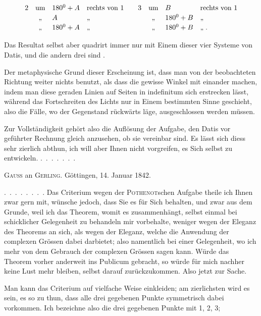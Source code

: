 \[
\begin{array}{rcll@{\qquad}rcll}
2 & \text{um} & 180^0+A & \text{rechts von }1 & 3 & \text{um} & B & \text{rechts von }1\\[2pt]
 & \text{,,} & A & \text{,,} & & \text{,,} & 180^0+B & \text{,,}\\[2pt]
 & \text{,,} & 180^0+A & \text{,,} & & \text{,,} & 180^0+B & \text{,,}\;.
\end{array}
\]

Das Resultat selbst aber quadrirt immer nur mit Einem dieser vier Systeme von Datis, und die andern drei sind .

Der metaphysische Grund dieser Erscheinung ist, dass man von der beobachteten Richtung weiter nichts benutzt, als dass die  gewisse Winkel mit einander machen, indem man diese geraden Linien auf  Seiten in indefinitum sich erstrecken lässt, während das Fortschreiten des Lichts nur in Einem bestimmten Sinne geschieht, also die Fälle, wo der Gegenstand rückwärts läge, ausgeschlossen werden müssen.

Zur Vollständigkeit gehört also die Auflösung der Aufgabe, den Datis vor geführter Rechnung gleich anzusehen, ob sie vereinbar sind. Es lässt sich diess sehr zierlich abthun, ich will aber Ihnen nicht vorgreifen, es Sich selbst zu entwickeln. \mbox{. . . . . . .}



\centerline{\textsc{Gauss} an \textsc{Gerling}. Göttingen, 14. Januar 1842.}

\indent \mbox{. . . . . . . .} Das Criterium wegen der \textsc{Pothenot}schen Aufgabe theile ich Ihnen zwar gern mit, wünsche jedoch, dass Sie es für Sich behalten, und zwar aus dem Grunde, weil ich das Theorem, womit es zusammenhängt, selbst einmal bei schicklicher Gelegenheit zu behandeln mir vorbehalte, weniger wegen der Eleganz des Theorems an sich, als wegen der Eleganz, welche die Anwendung der complexen Grössen dabei darbietet; also namentlich bei einer Gelegenheit, wo ich mehr von dem Gebrauch der complexen Grössen sagen kann. Würde das Theorem vorher anderweit ins Publicum gebracht, so würde für mich nachher keine Lust mehr bleiben, selbst darauf zurückzukommen. Also jetzt zur Sache.

Man kann das Criterium auf vielfache Weise einkleiden; am zierlichsten wird es sein, es so zu thun, dass alle drei gegebenen Punkte symmetrisch dabei vorkommen. Ich bezeichne also die drei gegebenen Punkte mit 1, 2, 3;
